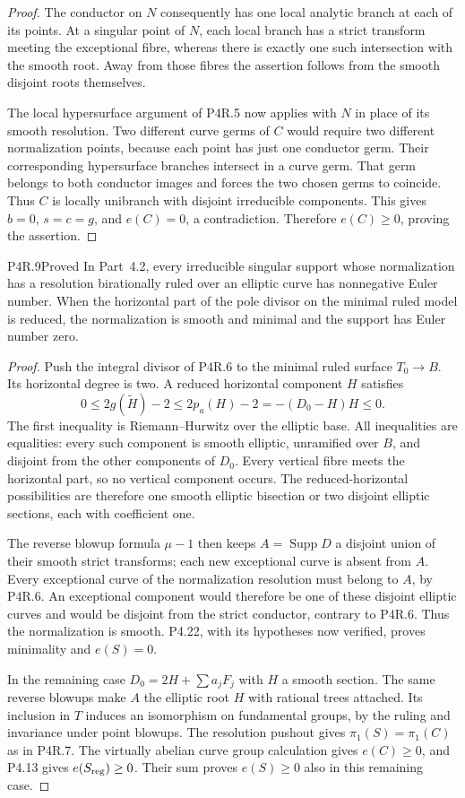 \begin{proof}
The conductor on $N$ consequently has
one local analytic branch at each of
its points. At a singular point of $N$,
each local branch has a strict transform
meeting the exceptional fibre, whereas
there is exactly one such intersection
with the smooth root. Away from those
fibres the assertion follows from the
smooth disjoint roots themselves.

The local hypersurface argument of
P4R.5 now applies with $N$ in place of
its smooth resolution. Two different
curve germs of $C$ would require two
different normalization points, because
each point has just one conductor germ.
Their corresponding hypersurface
branches intersect in a curve germ.
That germ belongs to both conductor
images and forces the two chosen germs
to coincide. Thus $C$ is locally
unibranch with disjoint irreducible
components. This gives $b=0$, $s=c=g$,
and $e(C)=0$, a contradiction.
Therefore $e(C)\ge0$, proving the
assertion.
\end{proof}

\begin{statement}{P4R.9}{Proved}
In Part~4.2, every irreducible singular
support whose normalization has a
resolution birationally ruled over an
elliptic curve has nonnegative Euler
number. When the horizontal part of
the pole divisor on the minimal ruled
model is reduced, the normalization
is smooth and minimal and the support
has Euler number zero.
\end{statement}
\begin{proof}
Push the integral divisor of P4R.6 to
the minimal ruled surface $T_0\to B$.
Its horizontal degree is two. A reduced
horizontal component $H$ satisfies
\[
 0\le 2g(\widetilde H)-2
 \le 2p_a(H)-2
 =-(D_0-H)H\le0.
\]
The first inequality is
Riemann--Hurwitz over the elliptic
base. All inequalities are equalities:
every such component is smooth elliptic,
unramified over $B$, and disjoint from
the other components of $D_0$. Every
vertical fibre meets the horizontal
part, so no vertical component occurs.
The reduced-horizontal possibilities
are therefore one smooth elliptic
bisection or two disjoint elliptic
sections, each with coefficient one.

The reverse blowup formula $\mu-1$
then keeps $A=\operatorname{Supp}D$
a disjoint union of their smooth
strict transforms; each new exceptional
curve is absent from $A$. Every
exceptional curve of the normalization
resolution must belong to $A$, by
P4R.6. An exceptional component would
therefore be one of these disjoint
elliptic curves and would be disjoint
from the strict conductor, contrary
to P4R.6. Thus the normalization is
smooth. P4.22, with its hypotheses now
verified, proves minimality and
$e(S)=0$.

In the remaining case
$D_0=2H+\sum a_jF_j$ with $H$ a
smooth section. The same reverse
blowups make $A$ the elliptic root $H$
with rational trees attached. Its
inclusion in $T$ induces an
isomorphism on fundamental groups,
by the ruling and invariance under
point blowups. The resolution pushout
gives $\pi_1(S)=\pi_1(C)$ as in
P4R.7. The virtually abelian curve
group calculation gives $e(C)\ge0$,
and P4.13 gives $e(S_{\rm reg})\ge0$.
Their sum proves $e(S)\ge0$ also
in this remaining case.
\end{proof}
